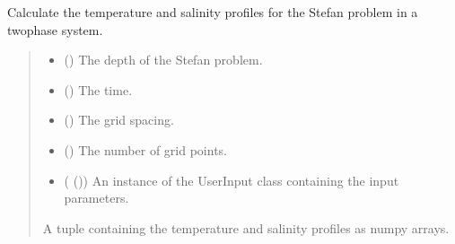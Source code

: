 \documentclass[a4paper,11pt,english,openany]{sphinxmanual}
\begin{document}
\begin{fulllineitems}
\begin{fulllineitems}
\label{\detokenize{api/spyice.models.stefan_problem:src.spyice.models.stefan_problem.StefanProblem.calculate_temperature_twophase_profiles}}
\pysigstartsignatures
\pysiglinewithargsret
{}
{\sphinxparamcomma {}\sphinxparamcomma {}\sphinxparamcomma {}\sphinxparamcomma {}}
{}
\pysigstopsignatures
\sphinxAtStartPar
Calculate the temperature and salinity profiles for the Stefan problem in a two\sphinxhyphen{}phase system.
\begin{quote}\begin{description}
\begin{itemize}
\item {} 
\sphinxAtStartPar
{} () \textendash{} The depth of the Stefan problem.

\item {} 
\sphinxAtStartPar
{} () \textendash{} The time.

\item {} 
\sphinxAtStartPar
{} () \textendash{} The grid spacing.

\item {} 
\sphinxAtStartPar
{} () \textendash{} The number of grid points.

\item {} 
\sphinxAtStartPar
{} ({\hyperref[\detokenize{api/spyice.parameters.user_input:src.spyice.parameters.user_input.UserInput}]{}} ()) \textendash{} An instance of the UserInput class containing the input parameters.

\end{itemize}

\sphinxAtStartPar
A tuple containing the temperature and salinity profiles as numpy arrays.


\end{description}
\end{quote}
\end{fulllineitems}
\end{fulllineitems}
\end{document}
